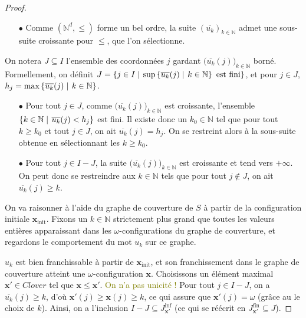 \documentclass[a4paper,final]{article}
\theoremstyle{definition}
\let\leq\leqslant
\let\geq\geqslant
\newcommand{\alain}[1]{\textcolor{blue}{#1}}
\newcommand{\lucas}[1]{\textcolor{olive}{#1}}
\newcommand{\set}[2]{\left\{#1\mathrel{\left|\vphantom{#1}\vphantom{#2}\right.}#2\right\}}
\newcommand{\N}{\ensuremath{\mathbb{N}}}
\newcommand{\clover}{\textit{Clover}}
\newcommand{\vect}[1]{\ensuremath{\mathbf{#1}}}
\newcommand{\xinit}{\ensuremath{\vect{x}_\text{init}}}
\newcommand{\valeur}[1]{\ensuremath{\overline{#1}}}
\newcommand{\Jfin}[1]{J^\text{fin}_{#1}}
\newcommand{\Jinf}[1]{J^\text{inf}_{#1}}
\begin{document}
\begin{proof}
\begin{itemize}
    \item[$\bullet$] Comme $(\N^d,\leq)$ forme un bel ordre, la suite $(\valeur{u_k})_{k\in\N}$ admet une sous-suite croissante pour $\leq$, que l'on sélectionne.
\end{itemize}
On notera $J\subseteq I$ l'ensemble des coordonnées $j$ gardant $\big( \valeur{u_k}(j) \big)_{k\in\N}$ borné.
Formellement, on définit $J = \set{j\in I} {\text{sup} \set{\valeur{u_k}(j)} {k\in\N} \text{ est fini}}$,
et pour $j\in J$, $h_j = \max \set{\valeur{u_k}(j)}{k\in\N}$.

 \begin{itemize}   
    \item[$\bullet$] Pour tout $j\in J$, comme $\big( \valeur{u_k}(j) \big)_{k\in\N}$ est croissante, l'ensemble $\set{k\in\N} {\valeur{u_k}(j) < h_j}$ est fini.
    Il existe donc un $k_0\in\N$ tel que pour tout $k\geq k_0$ et tout $j\in J$, on ait $\valeur{u_k}(j) = h_j$.
    On se restreint alors à la sous-suite obtenue en sélectionnant les $k\geq k_0$.
    
    \item[$\bullet$] Pour tout $j\in I-J$, la suite $\big( \valeur{u_k}(j) \big)_{k\in\N}$ est croissante et tend vers $+\infty$.
    On peut donc se restreindre aux $k\in\N$ tels que pour tout $j\notin J$, on ait $\valeur{u_k}(j) \geq k$.
\end{itemize}

\vspace{2mm}
On va raisonner à l'aide du graphe de couverture de $S$ à partir de la configuration initiale $\xinit$.
Fixons un $k\in\N$ strictement plus grand que toutes les valeurs entières apparaissant dans les $\omega$-configurations du graphe de couverture, et regardons le comportement du mot $u_k$ sur ce graphe.

$u_k$ est bien franchissable à partir de $\xinit$, et son franchissement dans le graphe de couverture atteint une $\omega$-configuration $\vect{x}$.
Choisissons un élément maximal $\vect{x'}\in\clover$ tel que $\vect{x} \leq \vect{x'}$.
\lucas{On n'a pas unicité !}
Pour tout $j\in I-J$, on a $\valeur{u_k}(j) \geq k$, d'où $\vect{x'}(j) \geq \vect{x}(j) \geq k$, ce qui assure que $\vect{x'}(j) = \omega$ (grâce au le choix de $k$).
Ainsi, on a l'inclusion $I-J \subseteq \Jinf{\vect{x'}}$ (ce qui se réécrit en $\Jfin{\vect{x'}} \subseteq J$).


\end{proof}
\end{document}
